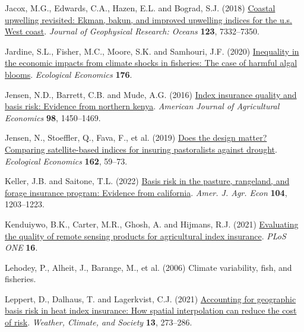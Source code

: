 \documentclass[
  letterpaper,
  DIV=11,
  numbers=noendperiod]{scrartcl}
\newlength{\cslhangindent}
\newlength{\cslentryspacingunit} %
\newenvironment{CSLReferences}[2] %
 {%
  \setlength{\parindent}{0pt}
  \ifodd #1
  \let\oldpar\par
  \def\par{\hangindent=\cslhangindent\oldpar}
  \fi
  \setlength{\parskip}{#2\cslentryspacingunit}
 }%
 {}
\begin{document}
\begin{CSLReferences}{1}{0}
\leavevmode{}%
Jacox, M.G., Edwards, C.A., Hazen, E.L. and Bograd, S.J. (2018)
\href{https://doi.org/10.1029/2018JC014187}{Coastal upwelling revisited:
Ekman, bakun, and improved upwelling indices for the u.s. West coast}.
\emph{Journal of Geophysical Research: Oceans} \textbf{123}, 7332--7350.

\leavevmode{}%
Jardine, S.L., Fisher, M.C., Moore, S.K. and Samhouri, J.F. (2020)
\href{https://doi.org/10.1016/j.ecolecon.2020.106691}{Inequality in the
economic impacts from climate shocks in fisheries: The case of harmful
algal blooms}. \emph{Ecological Economics} \textbf{176}.

\leavevmode{}%
Jensen, N.D., Barrett, C.B. and Mude, A.G. (2016)
\href{https://doi.org/10.1093/ajae/aaw046}{Index insurance quality and
basis risk: Evidence from northern kenya}. \emph{American Journal of
Agricultural Economics} \textbf{98}, 1450--1469.

\leavevmode{}%
Jensen, N., Stoeffler, Q., Fava, F., et al. (2019)
\href{https://doi.org/10.1016/J.ECOLECON.2019.04.014}{Does the design
matter? Comparing satellite-based indices for insuring pastoralists
against drought}. \emph{Ecological Economics} \textbf{162}, 59--73.

\leavevmode{}%
Keller, J.B. and Saitone, T.L. (2022)
\href{https://doi.org/10.1111/ajae.12282}{Basis risk in the pasture,
rangeland, and forage insurance program: Evidence from california}.
\emph{Amer. J. Agr. Econ} \textbf{104}, 1203--1223.

\leavevmode{}%
Kenduiywo, B.K., Carter, M.R., Ghosh, A. and Hijmans, R.J. (2021)
\href{https://doi.org/10.1371/journal.pone.0258215}{Evaluating the
quality of remote sensing products for agricultural index insurance}.
\emph{PLoS ONE} \textbf{16}.

\leavevmode{}%
Lehodey, P., Alheit, J., Barange, M., et al. (2006) Climate variability,
fish, and fisheries.

\leavevmode{}%
Leppert, D., Dalhaus, T. and Lagerkvist, C.J. (2021)
\href{https://doi.org/10.1175/WCAS-D-20-0070.1}{Accounting for
geographic basis risk in heat index insurance: How spatial interpolation
can reduce the cost of risk}. \emph{Weather, Climate, and Society}
\textbf{13}, 273--286.


\end{CSLReferences}
\end{document}
